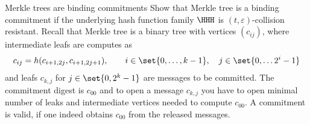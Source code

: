 \documentclass{crypto-exercise}
\author{Sven Laur}
\begin{document}
\begin{exercise}{Merkle trees are binding commitments}
Show that Merkle tree is a binding commitment if the underlying hash function family $\HHH$ is $(t,\varepsilon)$-collision resistant. Recall that Merkle tree is a binary tree with vertices $(c_{ij})$, where intermediate leafs are computes as
\begin{align*}
c_{ij}=h(c_{i+1,2j},c_{i+1,2j+1}), \qquad i\in\set{0,\ldots, k-1},\quad j\in\set{0,\ldots 2^i-1}
\end{align*} 
and leafs $c_{k,j}$ for $j\in\set{0,2^k-1}$ are messages to be committed. The commitment digest is $c_{00}$ and to open a message $c_{k,j}$ you have to open minimal number of leaks and intermediate vertices needed to compute $c_{00}$. A commitment is valid, if one indeed obtains $c_{00}$ from the released messages.  
\end{exercise}
\end{document}
